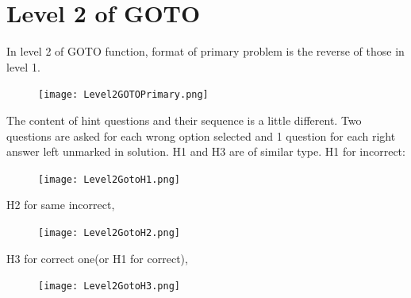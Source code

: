 \section{Level 2 of GOTO}
In level 2 of GOTO function, format of primary problem is the reverse of those in level 1.
\begin{figure}
\centering
\texttt{[image: Level2GOTOPrimary.png]}
\end{figure}

The content of hint questions and their sequence is a little different. Two questions are asked for each wrong option selected and 1 question for each right answer left unmarked in solution. H1 and H3 are of similar type.
H1 for incorrect:
\begin{figure}
\centering
\texttt{[image: Level2GotoH1.png]}
\end{figure}

H2 for same incorrect,
\begin{figure}
\centering
\texttt{[image: Level2GotoH2.png]}
\end{figure}

H3 for correct one(or H1 for correct),
\begin{figure}
\centering
\texttt{[image: Level2GotoH3.png]}
\end{figure}